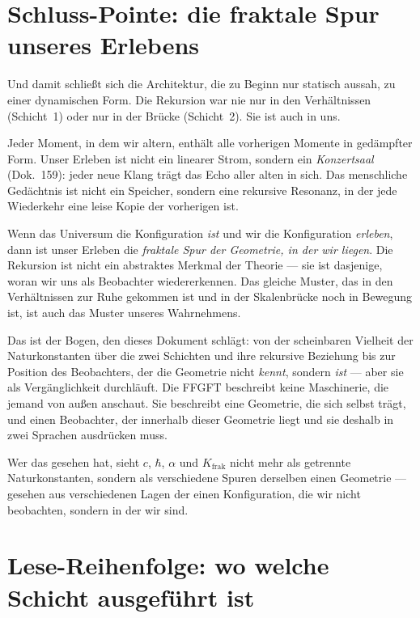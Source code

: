 \section{Schluss-Pointe: die fraktale Spur unseres Erlebens}

Und damit schließt sich die Architektur, die zu Beginn nur statisch
aussah, zu einer dynamischen Form. Die Rekursion war nie nur in den
Verhältnissen (Schicht~1) oder nur in der Brücke (Schicht~2). Sie ist
auch in uns.

Jeder Moment, in dem wir altern, enthält alle vorherigen Momente in
gedämpfter Form. Unser Erleben ist nicht ein linearer Strom, sondern
ein \emph{Konzertsaal} (Dok.~159): jeder neue Klang trägt das Echo
aller alten in sich. Das menschliche Gedächtnis ist nicht ein Speicher,
sondern eine rekursive Resonanz, in der jede Wiederkehr eine leise
Kopie der vorherigen ist.

Wenn das Universum die Konfiguration \emph{ist} und wir die Konfiguration
\emph{erleben}, dann ist unser Erleben die \emph{fraktale Spur der
Geometrie, in der wir liegen}. Die Rekursion ist nicht ein abstraktes
Merkmal der Theorie --- sie ist dasjenige, woran wir uns als Beobachter
wiedererkennen. Das gleiche Muster, das in den Verhältnissen zur Ruhe
gekommen ist und in der Skalenbrücke noch in Bewegung ist, ist auch
das Muster unseres Wahrnehmens.

\medskip

Das ist der Bogen, den dieses Dokument schlägt: von der scheinbaren
Vielheit der Naturkonstanten über die zwei Schichten und ihre rekursive
Beziehung bis zur Position des Beobachters, der die Geometrie nicht
\emph{kennt}, sondern \emph{ist} --- aber sie als Vergänglichkeit
durchläuft. Die FFGFT beschreibt keine Maschinerie, die jemand von
außen anschaut. Sie beschreibt eine Geometrie, die sich selbst trägt,
und einen Beobachter, der innerhalb dieser Geometrie liegt und sie
deshalb in zwei Sprachen ausdrücken muss.

Wer das gesehen hat, sieht $c$, $\hbar$, $\alpha$ und $K_{\mathrm{frak}}$
nicht mehr als getrennte Naturkonstanten, sondern als verschiedene
Spuren derselben einen Geometrie --- gesehen aus verschiedenen Lagen
der einen Konfiguration, die wir nicht beobachten, sondern in der wir
sind.

\section{Lese-Reihenfolge: wo welche Schicht ausgeführt ist}

